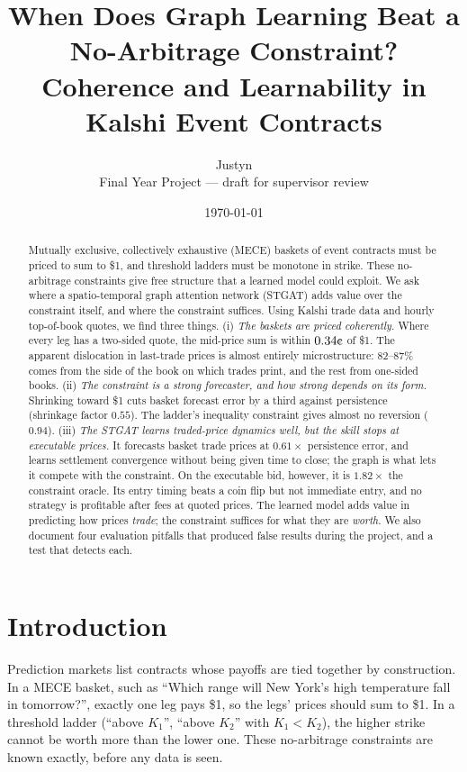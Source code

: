 \documentclass[11pt,a4paper]{article}
\title{\textbf{When Does Graph Learning Beat a No-Arbitrage Constraint?}\\[4pt]
\large Coherence and Learnability in Kalshi Event Contracts}
\author{Justyn\\[2pt]
\small Final Year Project --- draft for supervisor review}
\date{\today}
\newcommand{\cent}{\text{\textcent}}
\newcommand{\x}{\ensuremath{\times}}
\begin{document}
\maketitle

\begin{abstract}
Mutually exclusive, collectively exhaustive (MECE) baskets of event contracts must
be priced to sum to \$1, and threshold ladders must be monotone in strike. These
no-arbitrage constraints give free structure that a learned model could exploit.
We ask where a spatio-temporal graph attention network (STGAT) adds value over the
constraint itself, and where the constraint suffices. Using Kalshi trade data and
hourly top-of-book quotes, we find three things.
(i) \emph{The baskets are priced coherently.} Where every leg has a two-sided
quote, the mid-price sum is within $0.34\cent$ of \$1. The apparent dislocation
in last-trade prices is almost entirely microstructure: 82--87\% comes from the
side of the book on which trades print, and the rest from one-sided books.
(ii) \emph{The constraint is a strong forecaster, and how strong depends on its
form.} Shrinking toward \$1 cuts basket forecast error by a third against
persistence (shrinkage factor $0.55$). The ladder's inequality constraint gives
almost no reversion ($0.94$).
(iii) \emph{The STGAT learns traded-price dynamics well, but the skill stops at
executable prices.} It forecasts basket trade prices at $0.61\x$ persistence
error, and learns settlement convergence without being given time to close; the
graph is what lets it compete with the constraint. On the executable bid,
however, it is $1.82\x$ the constraint oracle. Its entry timing beats a coin flip
but not immediate entry, and no strategy is profitable after fees at quoted
prices. The learned model adds value in predicting how prices \emph{trade}; the
constraint suffices for what they are \emph{worth}. We also document four
evaluation pitfalls that produced false results during the project, and a test
that detects each.
\end{abstract}

\section{Introduction}

Prediction markets list contracts whose payoffs are tied together by construction.
In a MECE basket, such as ``Which range will New York's high temperature fall in
tomorrow?'', exactly one leg pays \$1, so the legs' prices should sum to \$1. In a
threshold ladder (``above $K_1$'', ``above $K_2$'' with $K_1<K_2$), the higher
strike cannot be worth more than the lower one. These no-arbitrage constraints are
known exactly, before any data is seen.
\end{document}
